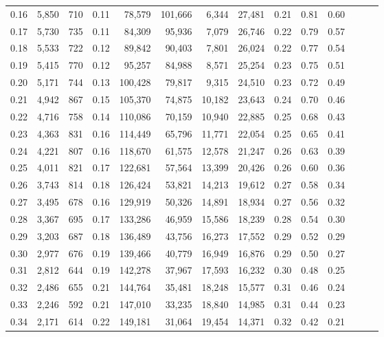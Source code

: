 \begin{tabular}{rrrrrrrrrrrrrr}
0.16 &  5,850 &  710 &  0.11 &   78,579 &  101,666 &   6,344 &  27,481 &  0.21 &  0.81 &      0.60 \\
0.17 &  5,730 &  735 &  0.11 &   84,309 &   95,936 &   7,079 &  26,746 &  0.22 &  0.79 &      0.57 \\
0.18 &  5,533 &  722 &  0.12 &   89,842 &   90,403 &   7,801 &  26,024 &  0.22 &  0.77 &      0.54 \\
0.19 &  5,415 &  770 &  0.12 &   95,257 &   84,988 &   8,571 &  25,254 &  0.23 &  0.75 &      0.51 \\
0.20 &  5,171 &  744 &  0.13 &  100,428 &   79,817 &   9,315 &  24,510 &  0.23 &  0.72 &      0.49 \\
0.21 &  4,942 &  867 &  0.15 &  105,370 &   74,875 &  10,182 &  23,643 &  0.24 &  0.70 &      0.46 \\
0.22 &  4,716 &  758 &  0.14 &  110,086 &   70,159 &  10,940 &  22,885 &  0.25 &  0.68 &      0.43 \\
0.23 &  4,363 &  831 &  0.16 &  114,449 &   65,796 &  11,771 &  22,054 &  0.25 &  0.65 &      0.41 \\
0.24 &  4,221 &  807 &  0.16 &  118,670 &   61,575 &  12,578 &  21,247 &  0.26 &  0.63 &      0.39 \\
0.25 &  4,011 &  821 &  0.17 &  122,681 &   57,564 &  13,399 &  20,426 &  0.26 &  0.60 &      0.36 \\
0.26 &  3,743 &  814 &  0.18 &  126,424 &   53,821 &  14,213 &  19,612 &  0.27 &  0.58 &      0.34 \\
0.27 &  3,495 &  678 &  0.16 &  129,919 &   50,326 &  14,891 &  18,934 &  0.27 &  0.56 &      0.32 \\
0.28 &  3,367 &  695 &  0.17 &  133,286 &   46,959 &  15,586 &  18,239 &  0.28 &  0.54 &      0.30 \\
0.29 &  3,203 &  687 &  0.18 &  136,489 &   43,756 &  16,273 &  17,552 &  0.29 &  0.52 &      0.29 \\
0.30 &  2,977 &  676 &  0.19 &  139,466 &   40,779 &  16,949 &  16,876 &  0.29 &  0.50 &      0.27 \\
0.31 &  2,812 &  644 &  0.19 &  142,278 &   37,967 &  17,593 &  16,232 &  0.30 &  0.48 &      0.25 \\
0.32 &  2,486 &  655 &  0.21 &  144,764 &   35,481 &  18,248 &  15,577 &  0.31 &  0.46 &      0.24 \\
0.33 &  2,246 &  592 &  0.21 &  147,010 &   33,235 &  18,840 &  14,985 &  0.31 &  0.44 &      0.23 \\
0.34 &  2,171 &  614 &  0.22 &  149,181 &   31,064 &  19,454 &  14,371 &  0.32 &  0.42 &      0.21 \\

\end{tabular}
